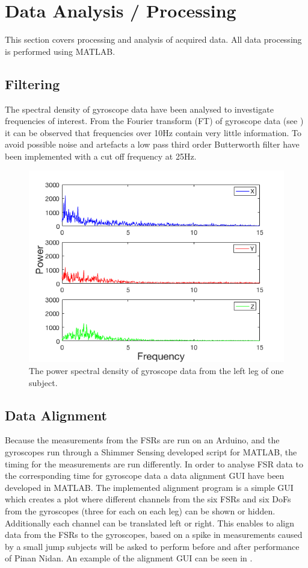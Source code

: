 \section{Data Analysis / Processing}
This section covers processing and analysis of acquired data. All data processing is performed using MATLAB. 

\subsection{Filtering}
The spectral density of gyroscope data have been analysed to investigate frequencies of interest. From the Fourier transform (FT) of gyroscope data (see ) it can be observed that frequencies over 10Hz contain very little information. To avoid possible noise and artefacts a low pass third order Butterworth filter have been implemented with a cut off frequency at 25Hz. %

\begin{figure}[H]
	\includegraphics[width=.6\textwidth]{figures/gyroFFTPlot}
	\caption{The power spectral density of gyroscope data from the left leg of one subject.}
	\label{fig:gyroFFTPlot}  %
\end{figure}



\subsection{Data Alignment}
Because the measurements from the FSRs are run on an Arduino, and the gyroscopes run through a Shimmer Sensing developed script for MATLAB, the timing for the measurements are run differently. In order to analyse FSR data to the corresponding time for gyroscope data a data alignment GUI have been developed in MATLAB. The implemented alignment program is a simple GUI which creates a plot where different channels from the six FSRs and six DoFs from the gyroscopes (three for each on each leg) can be shown or hidden. Additionally each channel can be translated left or right. This enables to align data from the FSRs to the gyroscopes, based on a spike in measurements caused by a small jump subjects will be asked to perform before and after performance of Pinan Nidan. An example of the alignment GUI can be seen in .

